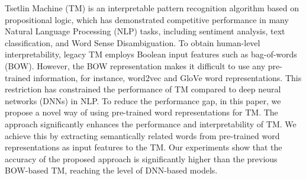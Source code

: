 Tsetlin Machine (TM) is an interpretable pattern recognition algorithm based on propositional logic, which has demonstrated competitive performance in many Natural Language Processing (NLP) tasks, including sentiment analysis, text classification, and Word Sense Disambiguation.  To obtain human-level interpretability, legacy TM employs Boolean input features such as bag-of-words (BOW). However, the BOW  representation makes it difficult to use any pre-trained information, for instance, word2vec and GloVe word representations. This restriction has constrained the performance of TM compared to deep neural networks (DNNs) in NLP. To reduce the performance gap, in this paper, we propose a novel way of using pre-trained word representations for TM. The approach significantly enhances the performance and interpretability of TM. We achieve this by extracting semantically related words from pre-trained word representations as input features to the TM. Our experiments show that the accuracy of the proposed approach is significantly higher than the previous BOW-based TM, reaching the level of DNN-based models.
